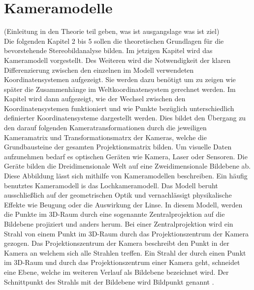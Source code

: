 \chapter{Kameramodelle}
\label{sec:CameraModels}

(Einleitung in den Theorie teil geben, was ist ausgangslage was ist ziel)\\


Die folgenden Kapitel 2 bis 5 sollen die theoretischen Grundlagen für die bevorstehende Stereobildanalyse bilden. Im jetzigen Kapitel wird das Kameramodell vorgestellt. Des Weiteren wird die Notwendigkeit der klaren Differenzierung zwischen den einzelnen im Modell verwendeten Koordinatensystemen aufgezeigt. Sie werden dazu benötigt um zu zeigen wie später die Zusammenhänge im Weltkoordinatensystem gerechnet werden. Im Kapitel  wird dann aufgezeigt, wie der Wechsel zwischen den Koordinatensystemen funktioniert und wie Punkte bezüglich unterschiedlich definierter Koordinatensysteme dargestellt werden. Dies bildet den Übergang zu den darauf folgenden Kameratransformationen durch die jeweiligen Kameramatrix und Transformationsmatrx der Kameras, welche die Grundbausteine der gesamten Projektionsmatrix bilden. Um visuelle Daten aufzunehmen bedarf es optischen Geräten wie Kamera, Laser oder Sensoren. Die Geräte bilden die Dreidimensionale Welt auf eine Zweidimensionale Bildebene ab. Diese Abbildung lässt sich mithilfe von Kameramodellen beschreiben. Ein häufig benutztes Kameramodell is das Lochkameramodell. 
Das Modell beruht ausschließlich auf der geometrischen Optik und vernachlässigt physikalische Effekte wie Beugung oder die Auswirkung der Linse\cite{Heipke}. In diesem Modell, werden die Punkte im 3D-Raum durch eine sogenannte Zentralprojektion auf die Bildebene projiziert und anders herum\cite{CamerModels.,HZ}. 
%
%
Bei einer Zentralprojektion wird ein Strahl von einem Punkt im 3D-Raum durch das Projektionszentrum der Kamera gezogen. Das Projektionszentrum der Kamera beschreibt den Punkt in der Kamera an welchem sich alle Strahlen treffen. Ein Strahl der durch einen Punkt im 3D-Raum und durch das Projektionszentrum einer Kamera geht, schneidet eine Ebene, welche im weiteren Verlauf als Bildebene bezeichnet wird. Der Schnittpunkt des Strahls mit der Bildebene wird Bildpunkt genannt \cite{CamerModels.,HZ}.\\

